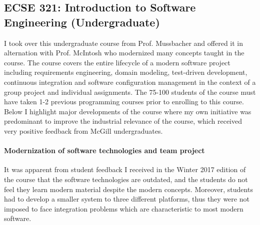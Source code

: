 \documentclass[a4paper,11pt]{report}
\begin{document}
\subsection{ECSE 321: Introduction to Software Engineering (Undergraduate)}
I took over this undergraduate course from Prof. Mussbacher and offered it in alternation with Prof. McIntosh who modernized many concepts taught in the course. The course covers the entire lifecycle of a modern software project including requirements engineering, domain modeling, test-driven development, continuous integration and software configuration management in the context of a group project and individual assignments. The 75-100 students of the course must have taken 1-2 previous programming courses prior to enrolling to this course. Below I highlight major developments of the course where my own initiative was predominant to improve the industrial relevance of the course, which received very positive feedback from McGill undergraduates. 

\paragraph{Modernization of software technologies and team project}
It was apparent from student feedback I received in the Winter 2017 edition of the course that the software technologies are outdated, and the students do not feel they learn modern material despite the modern concepts. Moreover, students had to develop a smaller system to three different platforms, thus they were not imposed to face integration problems which are characteristic to most modern software.
\end{document}
